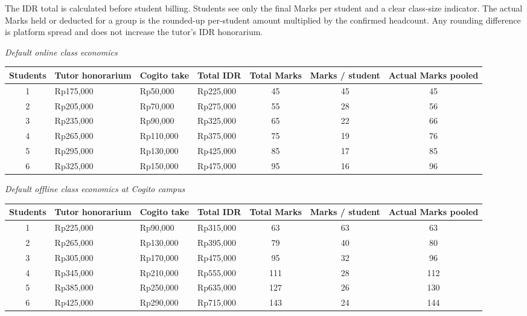 \documentclass[11pt,a4paper]{article}
\begin{document}
The IDR total is calculated before student billing. Students see only the final Marks per student and a clear class-size indicator. The actual Marks held or deducted for a group is the rounded-up per-student amount multiplied by the confirmed headcount. Any rounding difference is platform spread and does not increase the tutor's IDR honorarium.

\textit{Default online class economics}

\begin{center}
\scriptsize
\begin{tabular}{|c|p{2.1cm}|p{1.8cm}|p{1.8cm}|c|c|c|}
\hline
\textbf{Students} & \textbf{Tutor honorarium} & \textbf{Cogito take} & \textbf{Total IDR} & \textbf{Total Marks} & \textbf{Marks / student} & \textbf{Actual Marks pooled} \\
\hline
1 & Rp175,000 & Rp50,000 & Rp225,000 & 45 & 45 & 45 \\
\hline
2 & Rp205,000 & Rp70,000 & Rp275,000 & 55 & 28 & 56 \\
\hline
3 & Rp235,000 & Rp90,000 & Rp325,000 & 65 & 22 & 66 \\
\hline
4 & Rp265,000 & Rp110,000 & Rp375,000 & 75 & 19 & 76 \\
\hline
5 & Rp295,000 & Rp130,000 & Rp425,000 & 85 & 17 & 85 \\
\hline
6 & Rp325,000 & Rp150,000 & Rp475,000 & 95 & 16 & 96 \\
\hline
\end{tabular}
\end{center}
\normalsize

\textit{Default offline class economics at Cogito campus}

\begin{center}
\scriptsize
\begin{tabular}{|c|p{2.1cm}|p{1.8cm}|p{1.8cm}|c|c|c|}
\hline
\textbf{Students} & \textbf{Tutor honorarium} & \textbf{Cogito take} & \textbf{Total IDR} & \textbf{Total Marks} & \textbf{Marks / student} & \textbf{Actual Marks pooled} \\
\hline
1 & Rp225,000 & Rp90,000 & Rp315,000 & 63 & 63 & 63 \\
\hline
2 & Rp265,000 & Rp130,000 & Rp395,000 & 79 & 40 & 80 \\
\hline
3 & Rp305,000 & Rp170,000 & Rp475,000 & 95 & 32 & 96 \\
\hline
4 & Rp345,000 & Rp210,000 & Rp555,000 & 111 & 28 & 112 \\
\hline
5 & Rp385,000 & Rp250,000 & Rp635,000 & 127 & 26 & 130 \\
\hline
6 & Rp425,000 & Rp290,000 & Rp715,000 & 143 & 24 & 144 \\
\hline
\end{tabular}
\end{center}
\normalsize
\end{document}
